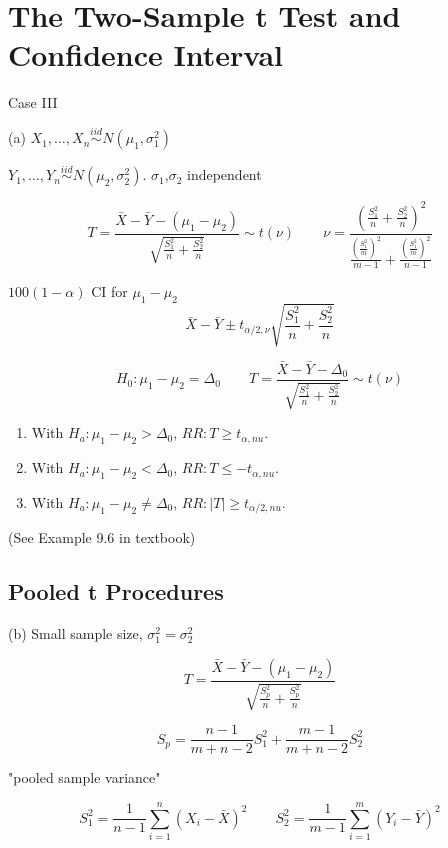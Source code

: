 \section{The Two-Sample t Test and Confidence Interval}
Case III

(a) $X_1,\dots,X_n \overset{iid}{\sim} N(\mu_1,\sigma_1^2)$

$Y_1,\dots,Y_n \overset{iid}{\sim} N(\mu_2,\sigma_2^2)$. $\sigma_1$,$\sigma_2$ independent 

\[T=\frac{\bar{X}-\bar{Y}-(\mu_1-\mu_2)}{\sqrt{\frac{S_1^2}{n}+\frac{S_2^2}{n}}} \sim t(\nu) \qquad \nu=\frac{\left( \frac{S_1^2}{n}+\frac{S_2^2}{n} \right)^2}{ \frac{\left( \frac{S_1^2}{m} \right)^2}{m-1}+ \frac{\left( \frac{S_1^2}{m} \right)^2}{n-1}  } \]

$100(1-\alpha)$ CI for $\mu_1-\mu_2$
\[\bar{X}-\bar{Y} \pm t_{\alpha/2,\nu} \sqrt{\frac{S_1^2}{n}+\frac{S_2^2}{n}}  \]

\[H_0:\mu_1-\mu_2=\Delta_0 \qquad T=\frac{\bar{X}-\bar{Y}-\Delta_0}{\sqrt{\frac{S_1^2}{n}+\frac{S_2^2}{n}}} \sim t(\nu)\]
\begin{enumerate}
\item With $H_a: \mu_1-\mu_2>\Delta_0$, $RR:T\geq t_{\alpha,nu}$.
\item With $H_a: \mu_1-\mu_2<\Delta_0$, $RR:T\leq -t_{\alpha,nu}$.
\item With $H_a: \mu_1-\mu_2\neq\Delta_0$, $RR:|T|\geq t_{\alpha/2,nu}$.
\end{enumerate}

\begin{exmp}
(See Example 9.6 in textbook)
\end{exmp}

\subsection{Pooled t Procedures}
(b) Small sample size, $\sigma_1^2=\sigma_2^2$

\[T=\frac{\bar{X}-\bar{Y}-(\mu_1-\mu_2)}{\sqrt{\frac{S_p^2}{n}+\frac{S_p^2}{n}}}\]

\[S_p=\frac{n-1}{m+n-2}S_1^2+\frac{m-1}{m+n-2}S_2^2\]

"pooled sample variance"

\[S_1^2=\frac{1}{n-1} \sum_{i=1}^n (X_i-\bar{X})^2 \qquad S_2^2=\frac{1}{m-1} \sum_{i=1}^m (Y_i-\bar{Y})^2 \]


